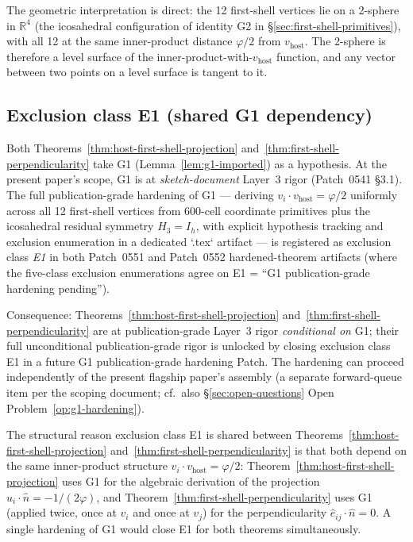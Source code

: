 \documentclass[11pt,letterpaper]{article}
\newcommand{\phig}{\varphi}
\newcommand{\vhost}{v_{\text{host}}}
\begin{document}
The geometric interpretation is direct: the 12 first-shell vertices lie on a 2-sphere in $\mathbb{R}^4$ (the icosahedral configuration of identity G2 in \S\ref{sec:first-shell-primitives}), with all 12 at the same inner-product distance $\phig/2$ from $\vhost$. The 2-sphere is therefore a level surface of the inner-product-with-$\vhost$ function, and any vector between two points on a level surface is tangent to it.

\subsection{Exclusion class E1 (shared G1 dependency)}
\label{sec:exclusion-e1}

Both Theorems~\ref{thm:host-first-shell-projection} and~\ref{thm:first-shell-perpendicularity} take G1 (Lemma~\ref{lem:g1-imported}) as a hypothesis. At the present paper's scope, G1 is at \emph{sketch-document} Layer~3 rigor (Patch~0541 \S3.1). The full publication-grade hardening of G1 --- deriving $v_i \cdot \vhost = \phig/2$ uniformly across all 12 first-shell vertices from 600-cell coordinate primitives plus the icosahedral residual symmetry $H_3 = I_h$, with explicit hypothesis tracking and exclusion enumeration in a dedicated `.tex` artifact --- is registered as exclusion class \emph{E1} in both Patch~0551 and Patch~0552 hardened-theorem artifacts (where the five-class exclusion enumerations agree on E1 = ``G1 publication-grade hardening pending'').

Consequence: Theorems~\ref{thm:host-first-shell-projection} and~\ref{thm:first-shell-perpendicularity} are at publication-grade Layer~3 rigor \emph{conditional on} G1; their full unconditional publication-grade rigor is unlocked by closing exclusion class E1 in a future G1 publication-grade hardening Patch. The hardening can proceed independently of the present flagship paper's assembly (a separate forward-queue item per the scoping document; cf.\ also \S\ref{sec:open-questions} Open Problem~\ref{op:g1-hardening}).

The structural reason exclusion class E1 is shared between Theorems~\ref{thm:host-first-shell-projection} and~\ref{thm:first-shell-perpendicularity} is that both depend on the same inner-product structure $v_i \cdot \vhost = \phig/2$: Theorem~\ref{thm:host-first-shell-projection} uses G1 for the algebraic derivation of the projection $\hat{u}_i \cdot \hat{n} = -1/(2\phig)$, and Theorem~\ref{thm:first-shell-perpendicularity} uses G1 (applied twice, once at $v_i$ and once at $v_j$) for the perpendicularity $\hat{e}_{ij} \cdot \hat{n} = 0$. A single hardening of G1 would close E1 for both theorems simultaneously.
\end{document}
